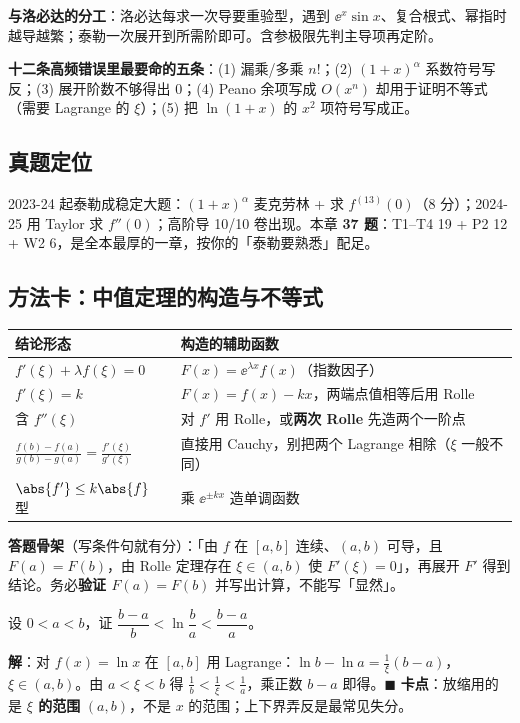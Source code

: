 \noindent\textbf{与洛必达的分工}：洛必达每求一次导要重验型，遇到 $\ee^{x}\sin x$、复合根式、幂指时越导越繁；泰勒一次展开到所需阶即可。含参极限先判主导项再定阶。

\noindent\textbf{十二条高频错误里最要命的五条}：(1) 漏乘/多乘 $n!$；(2) $(1+x)^\alpha$ 系数符号写反；(3) 展开阶数不够得出 $0$；(4) Peano 余项写成 $O(x^{n})$ 却用于证明不等式（需要 Lagrange 的 $\xi$）；(5) 把 $\ln(1+x)$ 的 $x^2$ 项符号写成正。

\subsection{真题定位}
2023-24 起泰勒成稳定大题：$(1+x)^\alpha$ 麦克劳林 + 求 $f^{(13)}(0)$（8 分）；2024-25 用 Taylor 求 $f''(0)$；高阶导 10/10 卷出现。本章 \textbf{37 题}：T1--T4 19 + P2 12 + W2 6，是全本最厚的一章，按你的「泰勒要熟悉」配足。

\subsection{方法卡：中值定理的构造与不等式}

\begin{center}
\begin{tabular}{@{}p{4.0cm}p{11.1cm}@{}}
\toprule
\textbf{结论形态} & \textbf{构造的辅助函数} \\
\midrule
$f'(\xi)+\lambda f(\xi)=0$ & $F(x)=\ee^{\lambda x}f(x)$（指数因子） \\
$f'(\xi)=k$ & $F(x)=f(x)-kx$，两端点值相等后用 Rolle \\
含 $f''(\xi)$ & 对 $f'$ 用 Rolle，或\textbf{两次 Rolle} 先造两个一阶点 \\
$\frac{f(b)-f(a)}{g(b)-g(a)}=\frac{f'(\xi)}{g'(\xi)}$ & 直接用 Cauchy，别把两个 Lagrange 相除（$\xi$ 一般不同） \\
$\abs{f'}\le k\abs{f}$ 型 & 乘 $\ee^{\pm kx}$ 造单调函数 \\
\bottomrule
\end{tabular}
\end{center}

\textbf{答题骨架}（写条件句就有分）：「由 $f$ 在 $[a,b]$ 连续、$(a,b)$ 可导，且 $F(a)=F(b)$，由 Rolle 定理存在 $\xi\in(a,b)$ 使 $F'(\xi)=0$」，再展开 $F'$ 得到结论。务必\textbf{验证 $F(a)=F(b)$} 并写出计算，不能写「显然」。

\begin{keypoint}
设 $0<a<b$，证 $\dfrac{b-a}{b}<\ln\dfrac{b}{a}<\dfrac{b-a}{a}$。

\noindent\textbf{解}：对 $f(x)=\ln x$ 在 $[a,b]$ 用 Lagrange：$\ln b-\ln a=\frac{1}{\xi}(b-a)$，$\xi\in(a,b)$。由 $a<\xi<b$ 得 $\frac1b<\frac1\xi<\frac1a$，乘正数 $b-a$ 即得。$\blacksquare$
\textbf{卡点}：放缩用的是 \textbf{$\xi$ 的范围} $(a,b)$，不是 $x$ 的范围；上下界弄反是最常见失分。
\end{keypoint}

